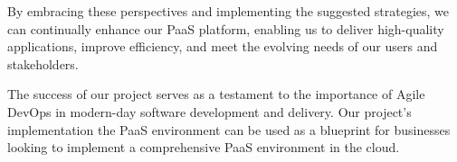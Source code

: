 \hspace{7mm}By embracing these perspectives and implementing the suggested strategies, we can continually enhance our PaaS platform, enabling us to deliver high-quality applications, improve efficiency, and meet the evolving needs of our users and stakeholders.

\hspace{7mm}The success of our project serves as a testament to the importance of Agile DevOps in modern-day software development and delivery. Our project's implementation the PaaS environment can be used as a blueprint for businesses looking to implement a comprehensive PaaS environment in the cloud.